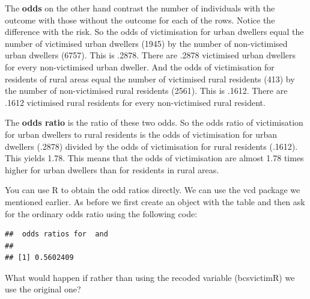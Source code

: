 \documentclass[]{book}
\newenvironment{Shaded}{\begin{snugshade}}{\end{snugshade}}
\newcommand{\CommentTok}[1]{\textcolor[rgb]{0.56,0.35,0.01}{\textit{#1}}}
\newcommand{\DataTypeTok}[1]{\textcolor[rgb]{0.13,0.29,0.53}{#1}}
\newcommand{\FloatTok}[1]{\textcolor[rgb]{0.00,0.00,0.81}{#1}}
\newcommand{\KeywordTok}[1]{\textcolor[rgb]{0.13,0.29,0.53}{\textbf{#1}}}
\newcommand{\NormalTok}[1]{#1}
\newcommand{\OperatorTok}[1]{\textcolor[rgb]{0.81,0.36,0.00}{\textbf{#1}}}
\newcommand{\OtherTok}[1]{\textcolor[rgb]{0.56,0.35,0.01}{#1}}
\theoremstyle{definition}
\theoremstyle{definition}
\theoremstyle{definition}
\theoremstyle{remark}
\begin{document}
The \textbf{odds} on the other hand contrast the number of individuals
with the outcome with those without the outcome for each of the rows.
Notice the difference with the risk. So the odds of victimisation for
urban dwellers equal the number of victimised urban dwellers (1945) by
the number of non-victimised urban dwellers (6757). This is .2878. There
are .2878 victimised urban dwellers for every non-victimised urban
dweller. And the odds of victimisation for residents of rural areas
equal the number of victimised rural residents (413) by the number of
non-victimised rural residents (2561). This is .1612. There are .1612
victimised rural residents for every non-victimised rural resident.

The \textbf{odds ratio} is the ratio of these two odds. So the odds
ratio of victimisation for urban dwellers to rural residents is the odds
of victimisation for urban dwellers (.2878) divided by the odds of
victimisation for rural residents (.1612). This yields 1.78. This means
that the odds of victimisation are almost 1.78 times higher for urban
dwellers than for residents in rural areas.

You can use R to obtain the odd ratios directly. We can use the vcd
package we mentioned earlier. As before we first create an object with
the table and then ask for the ordinary odds ratio using the following
code:

\begin{Shaded}
\end{Shaded}

\begin{verbatim}
##  odds ratios for  and  
## 
## [1] 0.5602409
\end{verbatim}

What would happen if rather than using the recoded variable (bcsvictimR)
we use the original one?
\end{document}

